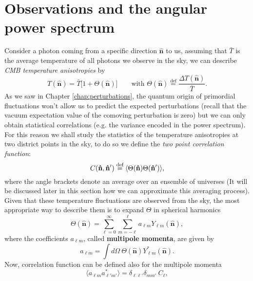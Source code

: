 \section{Observations and the angular power spectrum}\label{sec:AngularPowerSpectrum}
Consider a photon coming from a specific direction $\mathbf{\hat{n}}$ to us, assuming that $\bar{T}$ is the average temperature of all photons we observe in the sky, we can describe \emph{CMB temperature anisotropies} by
$$T(\mathbf{\hat{n}}) = \bar{T} \big[1 + \Theta(\mathbf{\hat{n}})\big] \qquad \text{with } \Theta(\mathbf{\hat{n}}) \stackrel{\text{def}}{=} \frac{\Delta T(\mathbf{\hat{n}})}{\bar{T}}.$$
As we saw in Chapter \ref{chap:perturbations}, the quantum origin of primordial fluctuations won't allow us to predict the expected perturbations (recall that the vacuum expectation value of the comoving perturbation is zero) but we can only obtain statistical correlations (e.g. the variance encoded in the power spectrum). For this reason we shall study the statistics of the temperature anisotropies at two district points in the sky, to do so we define the \emph{two point correlation function}:
\begin{equation} \label{eq:ani2pcf}
    C(\mathbf{\hat{n}},\mathbf{\hat{n}}') \stackrel{\text{def}}{=} \langle \Theta(\mathbf{\hat{n}})\Theta(\mathbf{\hat{n}}') \rangle,
\end{equation}
where the angle brackets denote an average over an ensemble of universes (It will be discussed later in this section how we can approximate this averaging process).\\ 
Given that these temperature fluctuations are observed from the sky, the most appropriate way to describe them is to expand $\Theta$ in spherical harmonics
\begin{equation}\label{eq:harmexpansion}
    \Theta(\mathbf{\hat{n}}) = \sum_{\ell=0}^{\infty} \sum_{m=-\ell}^{\ell} a_{\ell m} Y_{\ell m}(\mathbf{\hat{n}}),
\end{equation}
where the coefficients $a_{\ell m}$, called \textbf{multipole momenta}, are given by
\begin{equation*}
    a_{\ell m} = \int d\Omega\ \Theta(\mathbf{\hat{n}}) Y^*_{\ell m}(\mathbf{\hat{n}}).
\end{equation*}
Now, correlation function can be defined also for the multipole momenta
\begin{equation}\label{eq:angularpowerspectrum}
    \langle a_{\ell m} a^*_{\ell' m'} \rangle = \delta_{\ell \ell'} \delta_{m m'}\ C_{\ell},
\end{equation}

